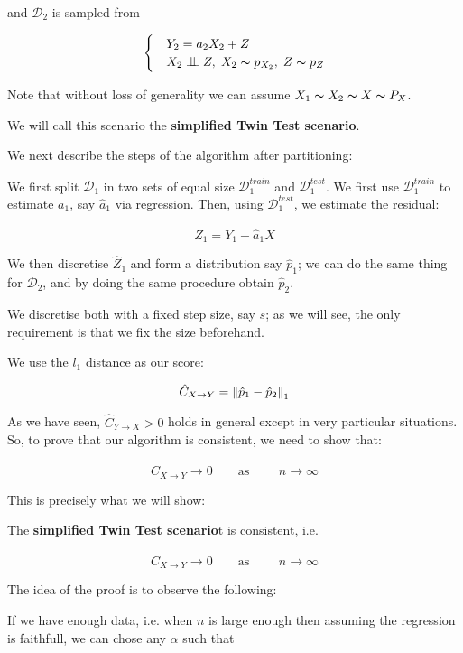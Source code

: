 and $\mathcal{D}_2$ is sampled from 

\[ \begin{cases} 
    & Y_2 = a_2 X_2 + Z  \\
    & X_2 \bigCI Z,\; X_2 \thicksim p_{X_2},\; Z \thicksim p_{Z}  
 \end{cases}
\]

Note that without loss of generality we can assume $X_1 \thicksim X_2 \thicksim X \thicksim P_X$.

We will call this scenario the \textbf{simplified Twin Test scenario}. 

We next describe the steps of the algorithm after partitioning:

We first split $\mathcal{D}_1$ in two sets of equal size $\mathcal{D}_{1}^{train}$ and 
$\mathcal{D}_{1}^{test}$. We first use $\mathcal{D}_{1}^{train}$ to estimate $a_1$, say $\hat{a}_1$ via 
regression. Then, using $\mathcal{D}_{1}^{test}$, we estimate the residual:

$$
    \hat{Z}_1 = Y_1 - \hat{a}_1 X
$$

We then discretise $\hat{Z}_1$ and form a distribution say $\hat{p}_1$; we can do the same thing for 
$\mathcal{D}_2$, and by doing the same procedure obtain $\hat{p}_2$.

We discretise both with a fixed step size, say $s$; as we will see, the only requirement is that we fix 
the size beforehand.

We use the $l_1$ distance as our score:

$$
    \hat{C}_{X \rightarrow Y} = \left\lVert\hat{p}_1 - \hat{p}_2\right\rVert_1
$$

As we have seen, $\hat{C}_{Y \rightarrow X} > 0$ holds in general except in very particular situations. So, 
to prove that our algorithm is consistent, we need to show that:

$$
    \hat{C}_{X \rightarrow Y} \rightarrow 0 \qquad \text{as }  \qquad n \rightarrow \infty
$$

This is precisely what we will show:

\begin{theorem}
    The \textbf{simplified Twin Test scenario}t is consistent, i.e. 

$$
    \hat{C}_{X \rightarrow Y} \rightarrow 0 \qquad \text{as }  \qquad n \rightarrow \infty
$$
\end{theorem}

The idea of the proof is to observe the following:

If we have enough data, i.e. when $n$ is large enough then assuming the regression is 
faithfull, we can chose any $\alpha$ such that

